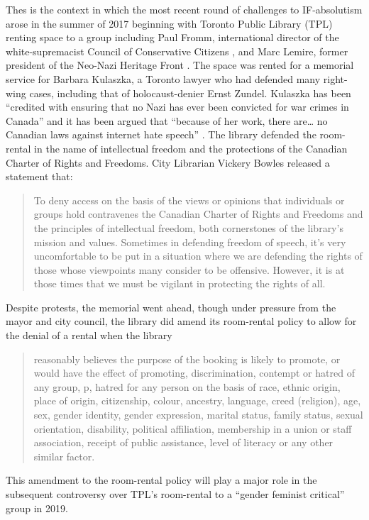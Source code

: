 \documentclass[12pt,oneside]{memoir}
\begin{document}
Thes is the context in which the most recent round of challenges to IF-absolutism arose in the summer of 2017 beginning with Toronto Public Library (TPL) renting space to a group including  Paul Fromm, international director of the white-supremacist Council of Conservative Citizens \cite{quan-2015}, and Marc Lemire, former president of the Neo-Nazi Heritage Front \cite{craggs-2019}. The space was rented for a memorial service for Barbara Kulaszka, a Toronto lawyer who had defended many right-wing cases, including that of holocaust-denier Ernst Zundel.  Kulaszka has been ``credited with ensuring that no Nazi has ever been convicted for war crimes in Canada'' and it has been argued that ``because of her work, there are{\ldots} no Canadian laws against internet hate speech'' \cite{shakeri-2017}. The library defended the room-rental in the name of intellectual freedom and the protections of the Canadian Charter of Rights and Freedoms. City Librarian Vickery Bowles released a statement that: 
\begin{quote}
To deny access on the basis of the views or opinions that individuals or groups hold contravenes the Canadian Charter of Rights and Freedoms and the principles of intellectual freedom, both cornerstones of the library's mission and values. Sometimes in defending freedom of speech, it's very uncomfortable to be put in a situation where we are defending the rights of those whose viewpoints many consider to be offensive. However, it is at those times that we must be vigilant in protecting the rights of all. \cite{tpl-kulaszka}
\end{quote}

 Despite protests, the memorial went ahead, though under pressure from the mayor and city council, the library did amend its room-rental policy to allow for the denial of a rental when the library 
\begin{quote}
reasonably believes the purpose of the booking is likely to promote, or would have the effect of promoting, discrimination, contempt or hatred of any group, p, hatred for any person on the basis of race, ethnic origin, place of origin, citizenship, colour, ancestry, language, creed (religion), age, sex, gender identity, gender expression, marital status, family status, sexual orientation, disability, political affiliation, membership in a union or staff association, receipt of public assistance, level of literacy or any other similar factor. \cite{tpl-revisions}
\end{quote}

This amendment to the room-rental policy will play a major role in the subsequent controversy over TPL's room-rental to a ``gender feminist critical'' group in 2019. 
\end{document}
